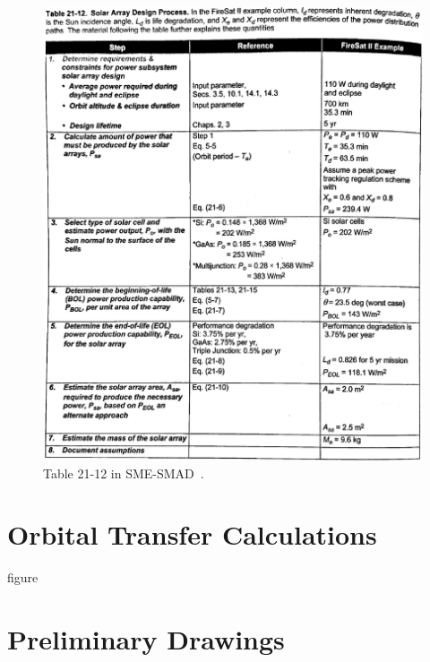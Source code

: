 \documentclass[9pt]{article}
\begin{document}
\begin{figure}[h]
  \centering
  \includegraphics[width=.8\textwidth]{2112}
  \caption{Table 21-12 in SME-SMAD~\cite[p. 644]{sme}.}
  \label{fig:2112}
\end{figure}


\clearpage
\section{Orbital Transfer Calculations}\label{app:orbcalcs}
figure


\vfill
\section{Preliminary Drawings}\label{app:julia}
\end{document}
